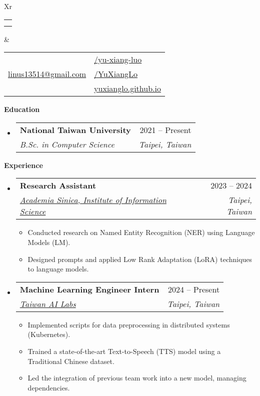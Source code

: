 \documentclass[letterpaper,12pt]{article}[leftmargin=*]
\makeatletter
\def \fullname {Yu Xiang Luo}
\def \subtitle {}
\def \linkedinicon {\faLinkedin}
\def \linkedinlink {https://linkedin.com/in/yu-xiang-luo-116793269/}
\def \linkedintext {/yu-xiang-luo}
\def \phoneicon {\faPhone}
\def \phonetext {+886 908-780-503}
\def \emailicon {\faEnvelope}
\def \emaillink {mailto:linus13514@gmail.com}
\def \emailtext {linus13514@gmail.com}
\def \githubicon {\faGithub}
\def \githublink {https://github.com/YuXiangLo}
\def \githubtext {/YuXiangLo}
\def \websiteicon {\faGlobe}
\def \websitelink {https://yuxianglo.github.io}
\def \websitetext {yuxianglo.github.io}
\def \headertype {\doublecol} %
\def \entryspacing {-0pt}
\def \linkedin {\linkedinicon \hspace{3pt}\href{\linkedinlink}{\linkedintext}}
\def \phone {\phoneicon \hspace{3pt}{ \phonetext}}
\def \email {\emailicon \hspace{3pt}\href{\emaillink}{\emailtext}}
\def \github {\githubicon \hspace{3pt}\href{\githublink}{\githubtext}}
\def \website {\websiteicon \hspace{3pt}\href{\websitelink}{\websitetext}}
\renewcommand{\section}[2]{\vspace{5pt}
  \colorbox{secondary}{\color{white}\raggedbottom\normalsize\textbf{{#1}{\hspace{7pt}#2}}}
}
\newcommand{\resumeEntryStart}{\begin{itemize}[leftmargin=2.5mm]}
\newcommand{\resumeEntryEnd}{\end{itemize}\vspace{\entryspacing}}
\newcommand{\resumeItemListStart}{\begin{itemize}[leftmargin=4.5mm]}
\newcommand{\resumeItemListEnd}{\end{itemize}}
\newcommand{\resumeItem}[1]{
  \item\small{
    {#1 \vspace{-2pt}}
  }
}
\newcommand{\resumeEntryTSDL}[4]{
  \vspace{-1pt}\item[]
    \begin{tabularx}{0.97\textwidth}{X@{\hspace{60pt}}r}
      \textbf{\color{primary}#1} & {\firabook\color{accent}\small#2} \\
      \textit{\color{accent}\small#3} & \textit{\color{accent}\small#4} \\
    \end{tabularx}\vspace{-6pt}
}
\newcommand{\doublecol}[6]{
  \begin{tabularx}{\textwidth}{Xr}
    {
      \begin{tabular}[c]{l}
        \fontsize{35}{45}\selectfont{\color{primary}{{\textbf{\fullname}}}} \\
        {\textit{\subtitle}} %
      \end{tabular}
    } & {
      \begin{tabular}[c]{l@{\hspace{1.5em}}l}
        {\small#4} & {\small#1} \\
        {\small#5} & {\small#2} \\
        {\small#6} & {\small#3}
      \end{tabular}
    }
  \end{tabularx}
}
\newcommand{\singlecol}[6]{
  \begin{tabularx}{\textwidth}{Xr}
    {
      \begin{tabular}[b]{l}
        \fontsize{35}{45}\selectfont{\color{primary}{{\textbf{\fullname}}}} \\
        {\textit{\subtitle}} %
      \end{tabular}
    } & {
      \begin{tabular}[c]{l}
        {\small#1} \\
        {\small#2} \\
        {\small#3} \\
        {\small#4} \\
        {\small#5} \\
        {\small#6}
      \end{tabular}
    }
  \end{tabularx}
}
\makeatother
\begin{document}


\headertype{\linkedin}{\github}{\website}{\phone}{\email}{} %
\vspace{-10pt} %

\section{\faGraduationCap}{Education}

  \resumeEntryStart
    \resumeEntryTSDL
      {National Taiwan University}{2021 -- Present}
      {B.Sc. in Computer Science}{Taipei, Taiwan}
  \resumeEntryEnd

\section{\faPieChart}{Experience}

  \resumeEntryStart
    \resumeEntryTSDL
      {Research Assistant}{2023 -- 2024}
      {\href{https://www.iis.sinica.edu.tw/}{Academia Sinica, Institute of Information Science}}
      {Taipei, Taiwan}
    \resumeItemListStart
      \resumeItem {Conducted research on Named Entity Recognition (NER) using Language Models (LM).}
      \resumeItem {Designed prompts and applied Low Rank Adaptation (LoRA) techniques to language models.}
    \resumeItemListEnd
  \resumeEntryEnd
  
  \resumeEntryStart
    \resumeEntryTSDL
      {Machine Learning Engineer Intern}{2024 -- Present}
      {\href{https://ailabs.tw/}{Taiwan AI Labs}}
      {Taipei, Taiwan}
    \resumeItemListStart
      \resumeItem {Implemented scripts for data preprocessing in distributed systems (Kubernetes).}
      \resumeItem {Trained a state-of-the-art Text-to-Speech (TTS) model using a Traditional Chinese dataset.}
      \resumeItem {Led the integration of previous team work into a new model, managing dependencies.}
    \resumeItemListEnd
  \resumeEntryEnd

\end{document}
